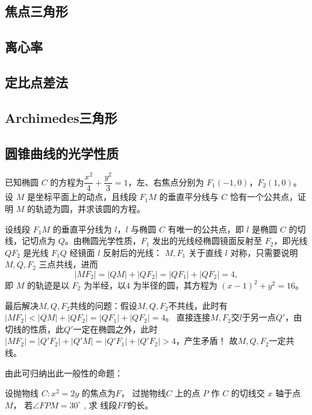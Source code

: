 \subsection{焦点三角形}
\clearpage
\subsection{离心率}
\clearpage
\subsection{定比点差法}
\clearpage
\subsection{Archimedes三角形}
\clearpage
\subsection{圆锥曲线的光学性质}
\begin{theorem}[椭圆的光学性质]
    
\end{theorem}
\begin{example}[2025八省联考18]
    已知椭圆 $C$ 的方程为\(\dfrac{x^2}{4}+\dfrac{y^2}{3}=1\)，左、右焦点分别为 $F_1(-1,0)$，$F_2(1,0)$。
  设 $M$ 是坐标平面上的动点，且线段 $F_1M$ 的垂直平分线与 $C$ 恰有一个公共点，证明 $M$ 的轨迹为圆，并求该圆的方程。
\end{example}
\begin{jie}
 设线段 $F_1M$ 的垂直平分线为 $l$，$l$ 与椭圆 $C$ 有唯一的公共点，即 $l$ 是椭圆 $C$ 的切线，记切点为 $Q$。由椭圆光学性质，$F_1$ 发出的光线经椭圆镜面反射至 $F_2$，即光线 $QF_2$ 是光线 $F_1Q$ 经镜面 $l$ 反射后的光线：
$M, F_1$ 关于直线 $l$ 对称，只需要说明$M, Q, F_2$ 三点共线，进而
\[
|MF_2| = |QM| + |QF_2| = |QF_1| + |QF_2| = 4,
\]
即 $M$ 的轨迹是以 $F_2$ 为半经，以$ 4$ 为半径的圆，其方程为 $(x-1)^2 + y^2 = 16$。

最后解决\(M,Q,F_2\)共线的问题：假设\(M,Q,F_2\)不共线，此时有$|MF_2| < |QM| + |QF_2| = |QF_1| + |QF_2| = 4$。
直接连接\(M, F_2\)交\(l\)于另一点\(Q'\)，由切线的性质，此\(Q'\)一定在椭圆之外，此时\(|MF_2|=|Q'F_2|+|Q'M|=|Q'F_1| + |Q'F_2|>4\)，产生矛盾！
故\(M,Q,F_2\)一定共线。
\end{jie}
由此可归纳出此一般性的命题：
\begin{proposition}
    
\end{proposition}
\begin{theorem}[双曲线的光学性质]
    
\end{theorem}
\begin{theorem}[抛物线的光学性质]
    
\end{theorem}
\begin{example}
 设抛物线 $C: x^{2}=2 y$ 的焦点为$ F$， 过抛物线$  C$ 上的点 $P$ 作 $ C $ 的切线交 
  $x$ 轴于点  $M $， 若$  \angle F P M=30^{\circ}$ , 求 
线段$F P$的长。
\end{example}

